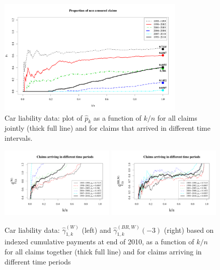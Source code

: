 \begin{figure}[h]
		\centering
		\includegraphics[width=0.8\textwidth]{./plots/paper2/pk_sliced.pdf}
		\caption{Car liability data: plot of $\hat{p}_k$ as a function of $k/n$ for all claims jointly (thick full line) and for claims that arrived in different time intervals.} 
	\label{paper2:fig7}
	\end{figure}

\begin{figure}[h]
		\centering
		\includegraphics[width=0.49\textwidth]{./plots/paper2/Worms_sliced.pdf}
	\includegraphics[width=0.49\textwidth]{./plots/paper2/WormsBR_sliced.pdf}
		\caption{Car liability data: $\hat{\gamma}_{1,k}^{(W)}$ (left) and $\hat{\gamma}_{1,k}^{(BR,W)}(-3)$ (right) based on indexed cumulative payments at end of 2010, as a function of $k/n$ for all claims together (thick full line) and for claims arriving in different time periods}
\label{paper2:fig8}
	\end{figure}
	
